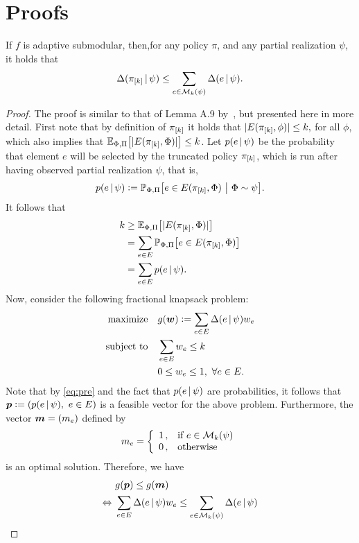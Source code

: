\section{Proofs}

\begin{lemma}\label{lem:submod}
  If $f$ is adaptive submodular, then,for any policy $\pi$, and any partial realization $\psi$, it holds that
  \begin{align*}
    \Delta(\pi_{[k]}\,\vert\,\psi) \leq \sum_{e \in \mathcal{M}_k(\psi)} \Delta(e\,\vert\,\psi).
  \end{align*}
\end{lemma}
\begin{proof}
  The proof is similar to that of Lemma A.9 by~\citet{golovin11}, but presented here in more detail.
  First note that by definition of $\pi_{[k]}$ it holds that $|E(\pi_{[k]}, \phi)| \leq k,$ for all $\phi$, which also implies that $\E[\Phi,\Pi]{|E(\pik, \Phi)|} \leq k$.
  Let $p(e\,\vert\,\psi)$ be the probability that element $e$ will be selected by the truncated policy $\pi_{[k]}$, which is run after having observed partial realization $\psi$, that is,
  \begin{align*}
    p(e\mmid\psi) \defeq \P[\Phi,\Pi]{e \in E(\pik, \Phi)}[\Phi \sim \psi].
  \end{align*}
  It follows that
  \begin{align}
    \label{eq:pre}
    \begin{split}
      k &\geq \E[\Phi, \Pi]{|E(\pik, \Phi)|}\\
        &= \sum_{e \in E}\P[\Phi,\Pi]{e \in E(\pik, \Phi)}\\
        &= \sum_{e \in E}p(e\mmid\psi).
    \end{split}
  \end{align}
  Now, consider the following fractional knapsack problem:
  \begin{align*}
    \textrm{maximize} & \quad g(\bm{w}) \vcentcolon= \sum_{e \in E}\Delta(e\,\vert\,\psi)w_e\\
    \textrm{subject to} & \quad \sum_{e \in E}w_e \leq k\\
               & \quad 0 \leq w_e \leq 1,\ \forall e \in E.
  \end{align*}
  Note that by \eqref{eq:pre} and the fact that $p(e\,\vert\,\psi)$ are probabilities, it follows that $\*p \defeq \left(p(e\mmid\psi),\ e \in E\right)$ is a feasible vector for the above problem.
  Furthermore, the vector $\bm{m} = (m_e)$ defined by
  \begin{align*}
    m_e = \twopartdefo{1}{e \in \mathcal{M}_k(\psi)}{0}
  \end{align*}
  is an optimal solution.
  Therefore, we have
  \begin{align}\label{eq:knap}
                    &\ g(\bm{p}) \leq g(\bm{m}) \notag\\
    \Leftrightarrow &\ \sum_{e \in E}\Delta(e\,\vert\,\psi)w_e \leq \sum_{e \in \mathcal{M}_k(\psi)} \Delta(e\,\vert\,\psi)
  \end{align}
  

\end{proof}
